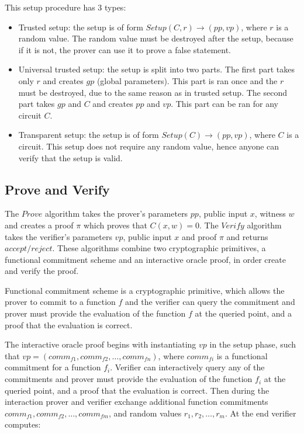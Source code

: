 This setup procedure has 3 types:

\begin{itemize}
    \item Trusted setup: the setup is of form $Setup(C, r) \rightarrow (pp, vp)$,
          where $r$ is a random value. The random value must be destroyed after
          the setup, because if it is not, the prover can use it to prove a false
          statement.
    \item Universal trusted setup: the setup is split into two parts. The first
          part takes only $r$ and creates $gp$ (global parameters). This part
          is ran once and the $r$ must be destroyed, due to the same reason as
          in trusted setup. The second part takes $gp$ and $C$ and creates
          $pp$ and $vp$. This part can be ran for any circuit $C$.
    \item Transparent setup: the setup is of form $Setup(C) \rightarrow (pp, vp)$,
          where $C$ is a circuit. This setup does not require any random value,
          hence anyone can verify that the setup is valid.
\end{itemize}

\subsection{Prove and Verify}

The $Prove$ algorithm takes the prover's parameters $pp$, public input $x$,
witness $w$ and creates a proof $\pi$ which proves that $C(x, w) = 0$.
The $Verify$ algorithm takes the verifier's parameters $vp$, public input $x$ and
proof $\pi$ and returns $accept/reject$. These algorithms combine two
cryptographic primitives, a functional commitment scheme and an interactive
oracle proof, in order create and verify the proof.

Functional commitment scheme is a cryptographic primitive, which allows the
prover to commit to a function $f$ and the verifier can query the commitment and
prover must provide the evaluation of the function $f$ at the queried point,
and a proof that the evaluation is correct.

The interactive oracle proof begins with instantiating $vp$ in the setup phase, such that
$vp = (comm_{f1}, comm_{f2}, \dots, comm_{fn})$, where $comm_{fi}$ is a
functional commitment for a function $f_i$. Verifier can interactively query
any of the commitments and prover must provide the evaluation of the function
$f_i$ at the queried point, and a proof that the evaluation is correct.
Then during the interaction prover and verifier exchange additional function
commitments $comm_{f1}, comm_{f2}, \dots, comm_{fm}$, and random values $r_1, r_2, \dots, r_m$.
At the end verifier computes:

